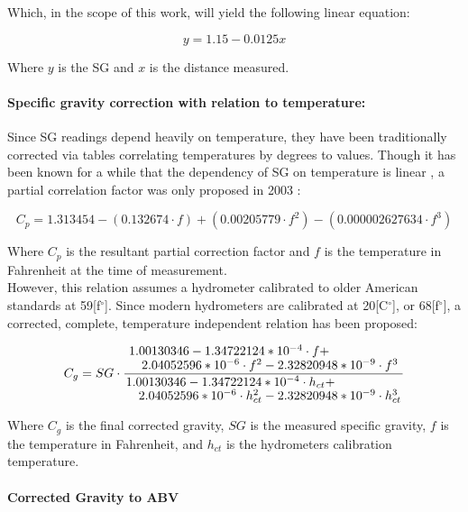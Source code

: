 \documentclass[twoside]{ctuthesis}
\theoremstyle{plain}
\theoremstyle{definition}
\theoremstyle{note}
\begin{document}
Which, in the scope of this work, will yield the following linear equation:

\begin{equation}
	y = 1.15 - 0.0125 x
\end{equation}

Where $y$ is the SG and $x$ is the distance measured.\\

\paragraph{Specific gravity correction with relation to temperature:}
Since SG readings depend heavily on temperature, they have been traditionally corrected via tables correlating temperatures by degrees to values. Though it has been known for a while that the dependency of SG on temperature is linear \cite{Temp_To_SG}, a partial correlation factor was only proposed in 2003 \cite{Joy_Of_Brewing}:

\begin{equation}
C_p = 1.313454 - (0.132674\cdot f) + (0.00205779 \cdot f^2) - (0.000002627634 \cdot f^3)
\end{equation}

Where $C_p$ is the resultant partial correction factor and $f$ is the temperature in Fahrenheit at the time of measurement.\\
However, this relation assumes a hydrometer calibrated to older American standards at 59[f$^\circ$]. Since modern hydrometers are calibrated at 20[C$^\circ$], or 68[f$^\circ$], a corrected, complete, temperature independent relation has been proposed:

\begin{equation}
C_g = SG \cdot \frac{\splitfrac{1.00130346 - 1.34722124*10^{-4} \cdot f + }{2.04052596*10^{-6} \cdot f^2 - 2.32820948*10^{-9} \cdot f^3} }{\splitfrac{1.00130346 - 1.34722124*10^{-4} \cdot h_{ct} +}{ 2.04052596*10^{-6} \cdot h_{ct}^2 - 2.32820948*10^{-9} \cdot h_{ct}^3}}
\end{equation}

Where $C_g$ is the final corrected gravity, $SG$ is the measured specific gravity, $f$ is the temperature in Fahrenheit, and $h_{ct}$ is the hydrometers calibration temperature.\\

\paragraph{Corrected Gravity to ABV}
\end{document}
